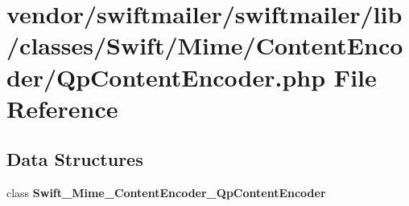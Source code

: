 \section{vendor/swiftmailer/swiftmailer/lib/classes/\+Swift/\+Mime/\+Content\+Encoder/\+Qp\+Content\+Encoder.php File Reference}
\label{_qp_content_encoder_8php}
\subsection*{Data Structures}
\begin{DoxyCompactItemize}
\item 
class {\bf Swift\+\_\+\+Mime\+\_\+\+Content\+Encoder\+\_\+\+Qp\+Content\+Encoder}
\end{DoxyCompactItemize}
